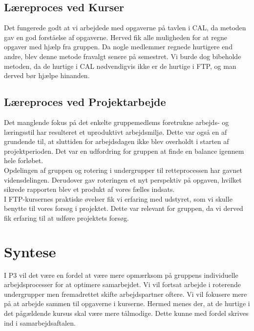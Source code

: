 \subsection{Læreproces ved Kurser}
Det fungerede godt at vi arbejdede med opgaverne på tavlen i CAL, da metoden gav en god forståelse af opgaverne. Herved fik alle muligheden for at regne opgaver med hjælp fra gruppen. Da nogle medlemmer regnede hurtigere end andre, blev denne metode fravalgt senere på semestret. Vi burde dog bibeholde metoden, da de hurtige i CAL nødvendigvis ikke er de hurtige i FTP, og man derved bør hjælpe hinanden. \\
 
\subsection{Læreproces ved Projektarbejde}
Det manglende fokus på det enkelte gruppemedlems foretrukne arbejds- og læringsstil har resulteret et uproduktivt arbejdsmiljø. Dette var også en af grundende til, at sluttiden for arbejdsdagen ikke blev overholdt i starten af projektperioden. Det var en udfordring for gruppen at finde en balance igennem hele forløbet. \\
Opdelingen af gruppen og rotering i undergrupper til retteprocessen har gavnet vidensdelingen. Derudover gav roteringen et nyt perspektiv på opgaven, hvilket sikrede rapporten blev et produkt af vores fælles indsats. \\
I FTP-kursernes praktiske øvelser fik vi erfaring med udstyret, som vi skulle benytte til vores forsøg i projektet. Dette var relevant for gruppen, da vi derved fik erfaring til at udføre projektets forsøg.

\section{Syntese}
I P$3$ vil det være en fordel at være mere opmærksom på gruppens individuelle arbejdsprocesser for at optimere samarbejdet. Vi vil fortsat arbejde i roterende undergrupper men fremadrettet skifte arbejdspartner oftere.
Vi vil fokusere mere på at arbejde sammen til opgaverne i kurserne. Hermed menes der, at de hurtige i det pågældende kursus skal være mere tålmodige. Dette kunne med fordel skrives ind i samarbejdsaftalen.